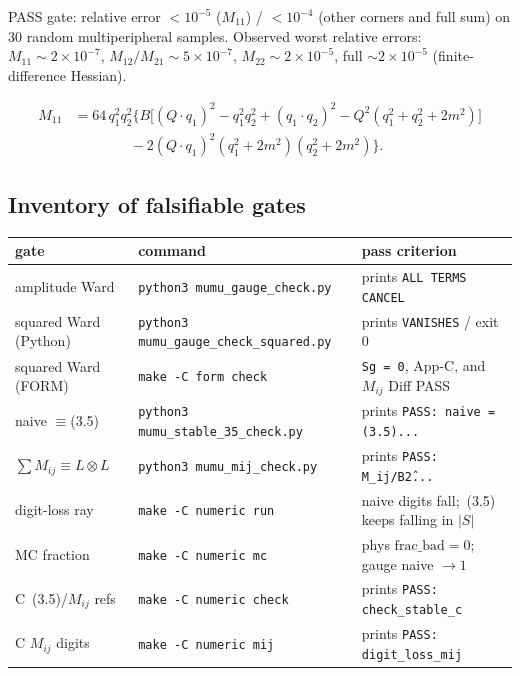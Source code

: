 \documentclass[11pt]{article}
\begin{document}
PASS gate: relative error $<10^{-5}$ ($M_{11}$) / $<10^{-4}$ (other
corners and full sum) on 30 random multiperipheral samples. Observed
worst relative errors:
$M_{11}\sim2\times10^{-7}$,
$M_{12}/M_{21}\sim5\times10^{-7}$,
$M_{22}\sim2\times10^{-5}$,
full $\sim2\times10^{-5}$ (finite-difference Hessian).

\begin{equation}
\begin{aligned}
  M_{11}
  &= 64\,q_1^2 q_2^2\Big\{
       B\big[(Q{\cdot}q_1)^2 - q_1^2 q_2^2 + (q_1{\cdot}q_2)^2
             - Q^2(q_1^2+q_2^2+2m^2)\big] \\
  &\qquad\qquad
       - 2(Q{\cdot}q_1)^2(q_1^2+2m^2)(q_2^2+2m^2)
     \Big\}.
\end{aligned}
\label{eq:M11}
\end{equation}

\subsection{Inventory of falsifiable gates}
\label{app:gates}

\begin{center}
\begin{tabular}{@{}llp{}@{}}
\toprule
gate & command & pass criterion \\
\midrule
amplitude Ward
  & \texttt{python3 mumu\_gauge\_check.py}
  & prints \texttt{ALL TERMS CANCEL} \\
squared Ward (Python)
  & \texttt{python3 mumu\_gauge\_check\_squared.py}
  & prints \texttt{VANISHES} / exit 0 \\
squared Ward (FORM)
  & \texttt{make -C form check}
  & \texttt{Sg = 0}, App-C, and $M_{ij}$ Diff PASS \\
naive $\equiv$(3.5)
  & \texttt{python3 mumu\_stable\_35\_check.py}
  & prints \texttt{PASS: naive = (3.5)...} \\
$\sum M_{ij}\equiv L\otimes L$
  & \texttt{python3 mumu\_mij\_check.py}
  & prints \texttt{PASS: M\_ij/B\^2...} \\
digit-loss ray
  & \texttt{make -C numeric run}
  & naive digits fall;~(3.5) keeps falling in $|S|$ \\
MC fraction
  & \texttt{make -C numeric mc}
  & phys $\mathrm{frac\_bad}=0$; gauge naive $\to1$ \\
C~(3.5)/$M_{ij}$ refs
  & \texttt{make -C numeric check}
  & prints \texttt{PASS: check\_stable\_c} \\
C $M_{ij}$ digits
  & \texttt{make -C numeric mij}
  & prints \texttt{PASS: digit\_loss\_mij} \\
\bottomrule
\end{tabular}
\end{center}
\end{document}

